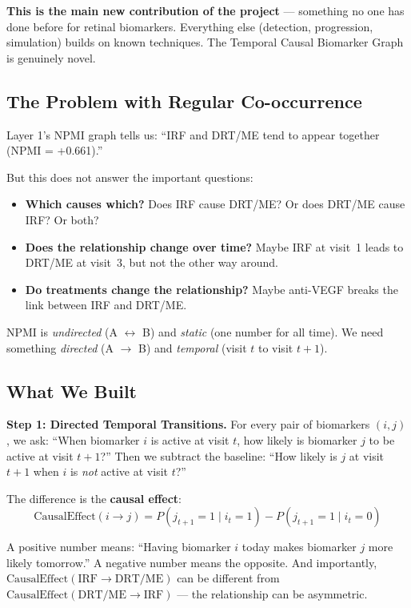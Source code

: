 \documentclass[12pt,a4paper]{article}
\begin{document}
\begin{mdframed}[style=novelbox]
\textbf{This is the main new contribution of the project} --- something no one has done before for retinal biomarkers. Everything else (detection, progression, simulation) builds on known techniques. The Temporal Causal Biomarker Graph is genuinely novel.
\end{mdframed}

\subsection{The Problem with Regular Co-occurrence}

Layer 1's NPMI graph tells us: ``IRF and DRT/ME tend to appear together (NPMI = +0.661).''

But this does not answer the important questions:

\begin{itemize}
  \item \textbf{Which causes which?} Does IRF cause DRT/ME? Or does DRT/ME cause IRF? Or both?
  \item \textbf{Does the relationship change over time?} Maybe IRF at visit~1 leads to DRT/ME at visit~3, but not the other way around.
  \item \textbf{Do treatments change the relationship?} Maybe anti-VEGF breaks the link between IRF and DRT/ME.
\end{itemize}

NPMI is \emph{undirected} (A $\leftrightarrow$ B) and \emph{static} (one number for all time). We need something \emph{directed} (A $\to$ B) and \emph{temporal} (visit $t$ to visit $t{+}1$).

\subsection{What We Built}

\textbf{Step 1: Directed Temporal Transitions.} For every pair of biomarkers $(i, j)$, we ask: ``When biomarker $i$ is active at visit $t$, how likely is biomarker $j$ to be active at visit $t{+}1$?'' Then we subtract the baseline: ``How likely is $j$ at visit $t{+}1$ when $i$ is \emph{not} active at visit $t$?''

The difference is the \textbf{causal effect}:
\[
\text{CausalEffect}(i \to j) = P(j_{t+1} = 1 \mid i_t = 1) - P(j_{t+1} = 1 \mid i_t = 0)
\]

A positive number means: ``Having biomarker $i$ today makes biomarker $j$ more likely tomorrow.'' A negative number means the opposite. And importantly, $\text{CausalEffect}(\text{IRF} \to \text{DRT/ME})$ can be different from $\text{CausalEffect}(\text{DRT/ME} \to \text{IRF})$ --- the relationship can be asymmetric.
\end{document}
